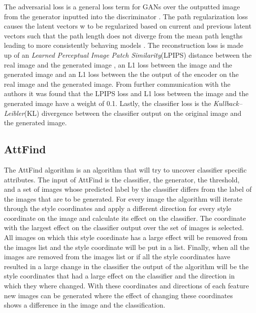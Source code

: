The adversarial loss is a general loss term for GANs over the outputted image from the generator inputted into the discriminator \cite{goodfellow2014generative}. The path regularization loss causes the latent vectors w to be regularized based on current and previous latent vectors such that the path length does not diverge from the mean path lengths leading to more consistently behaving models \cite{karras2020analyzing}. The reconstruction loss is made up of an \textit{Learned Perceptual Image Patch Similarity}(LPIPS) distance between the real image and the generated image \cite{DBLP:Zhang}, an L1 loss between the image and the generated image and an L1 loss between the the output of the encoder on the real image and the generated image. From further communication with the authors it was found that the LPIPS loss and L1 loss between the image and the generated image have a weight of 0.1. Lastly, the classifier loss is the \textit{Kullback–Leibler}(KL) divergence between the classifier output on the original image and the generated image.


\subsection{AttFind}
The AttFind algorithm is an algorithm that will try to uncover classifier specific attributes. The input of AttFind is the classifier, the generator, the threshold, and a set of images whose predicted label by the classifier differs from the label of the images that are to be generated. For every image the algorithm will iterate through the style coordinates and apply a different direction for every style coordinate on the image and calculate its effect on the classifier. The coordinate with the largest effect on the classifier output over the set of images is selected. All images on which this style coordinate has a large effect will be removed from the images list and the style coordinate will be put in a list. Finally, when all the images are removed from the images list or if all the style coordinates have resulted in a large change in the classifier the output of the algorithm will be the style coordinates that had a large effect on the classifier and the direction in which they where changed. With these coordinates and directions of each feature new images can be generated where the effect of changing these coordinates shows a difference in the image and the classification.

